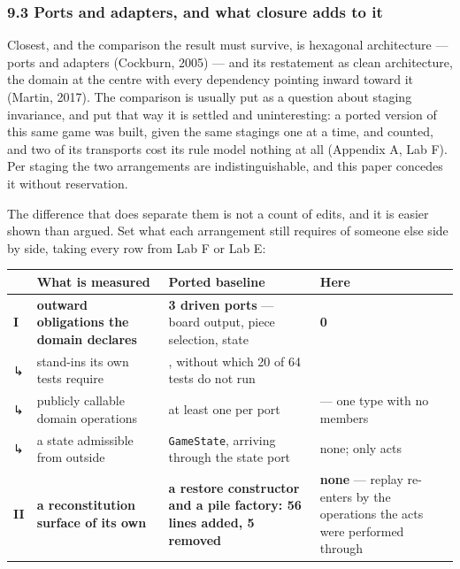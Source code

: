 \documentclass[
]{article}
\newcounter{none} %
\begin{document}
\subsubsection{9.3 Ports and adapters, and what closure adds to
it}\label{ports-and-adapters-and-what-closure-adds-to-it}

Closest, and the comparison the result must survive, is hexagonal
architecture --- ports and adapters (Cockburn, 2005) --- and its
restatement as clean architecture, the domain at the centre with every
dependency pointing inward toward it (Martin, 2017). The comparison is
usually put as a question about staging invariance, and put that way it
is settled and uninteresting: a ported version of this same game was
built, given the same stagings one at a time, and counted, and two of
its transports cost its rule model nothing at all (Appendix A, Lab F).
Per staging the two arrangements are indistinguishable, and this paper
concedes it without reservation.

The difference that does separate them is not a count of edits, and it
is easier shown than argued. Set what each arrangement still requires of
someone else side by side, taking every row from Lab F or Lab E:

{\def\LTcaptype{none} %
\begin{longtable}[]{@{}
  >{\raggedright\arraybackslash}p{}
  >{\raggedright\arraybackslash}p{}
  >{\raggedright\arraybackslash}p{}
  >{\raggedright\arraybackslash}p{}@{}}
\toprule\noalign{}
\begin{minipage}[b]{\linewidth}\raggedright
\end{minipage} & \begin{minipage}[b]{\linewidth}\raggedright
What is measured
\end{minipage} & \begin{minipage}[b]{\linewidth}\raggedright
Ported baseline
\end{minipage} & \begin{minipage}[b]{\linewidth}\raggedright
Here
\end{minipage} \\
\midrule\noalign{}
\endhead
\bottomrule\noalign{}
\endlastfoot
\textbf{I} & \textbf{outward obligations the domain declares} &
\textbf{3 driven ports} --- board output, piece selection, state &
\textbf{0} \\
↳ & stand-ins its own tests require & 3, without which 20 of 64 tests do
not run & 0 \\
↳ & publicly callable domain operations & at least one per port & 0 ---
one type with no members \\
↳ & a state admissible from outside & \texttt{GameState}, arriving
through the state port & none; only acts \\
\textbf{II} & \textbf{a reconstitution surface of its own} & \textbf{a
restore constructor and a pile factory: 56 lines added, 5 removed} &
\textbf{none} --- replay re-enters by the operations the acts were
performed through \\
\end{longtable}
}
\end{document}
